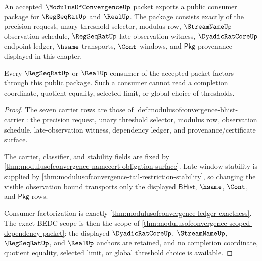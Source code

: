 \begin{theorem}\label{thm:modulusofconvergence-realup-public-export}
An accepted $\ModulusOfConvergenceUp$ packet exports a public consumer package
for $\RegSeqRatUp$ and $\RealUp$. The package consists exactly of the
precision request, unary threshold selector, modulus row,
$\StreamNameUp$ observation schedule, $\RegSeqRatUp$ late-observation witness,
$\DyadicRatCoreUp$ endpoint ledger, $\hsame$ transports, $\Cont$ windows, and
$\mathsf{Pkg}$ provenance displayed in this chapter.

Every $\RegSeqRatUp$ or $\RealUp$ consumer of the accepted packet factors
through this public package. Such a consumer cannot read a completion
coordinate, quotient equality, selected limit, or global choice of thresholds.
\end{theorem}
\begin{proof}
The seven carrier rows are those of
\autoref{def:modulusofconvergence-bhist-carrier}: the precision request,
unary threshold selector, modulus row, observation schedule, late-observation
witness, dependency ledger, and provenance/certificate surface.

The carrier, classifier, and stability fields are fixed by
\autoref{thm:modulusofconvergence-namecert-obligation-surface}. Late-window
stability is supplied by
\autoref{thm:modulusofconvergence-tail-restriction-stability}, so changing the
visible observation bound transports only the displayed $\mathsf{BHist}$,
$\hsame$, $\Cont$, and $\mathsf{Pkg}$ rows.

Consumer factorization is exactly
\autoref{thm:modulusofconvergence-ledger-exactness}. The exact BEDC scope is
then the scope of \autoref{thm:modulusofconvergence-scoped-dependency-packet}:
the displayed $\DyadicRatCoreUp$, $\StreamNameUp$, $\RegSeqRatUp$, and
$\RealUp$ anchors are retained, and no completion coordinate, quotient
equality, selected limit, or global threshold choice is available.
\end{proof}

